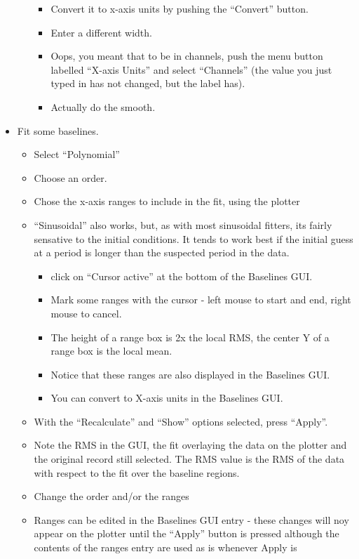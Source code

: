 \begin{itemize}
\begin{itemize}
\begin{itemize}
\item Convert it to x-axis units by pushing the ``Convert'' button.
\item Enter a different width.
\item Oops, you meant that to be in channels, push the menu button
labelled ``X-axis Units'' and select ``Channels'' (the value you just
typed in has not changed, but the label has).
\item Actually do the smooth.
\end{itemize}
\end{itemize}
\item Fit some baselines.
\begin{itemize}
\item Select ``Polynomial'' 
\item Choose an order.
\item Chose the x-axis ranges to include in the fit, using the plotter
\item ``Sinusoidal'' also works, but, as with most sinusoidal fitters, its
fairly sensative to the initial conditions.  It tends to work best if
the initial guess at a period is longer than the suspected period in the data.
\begin{itemize}
\item click on ``Cursor active'' at the bottom of the Baselines GUI.
\item Mark some ranges with the cursor - left mouse to start and end, right
mouse to cancel.
\item The height of a range box is 2x the local RMS, the center Y of a 
range box is the local mean.
\item Notice that these ranges are also displayed in the Baselines GUI.
\item You can convert to X-axis units in the Baselines GUI.
\end{itemize}
\item With the ``Recalculate'' and ``Show'' options selected, press ``Apply''.
\item Note the RMS in the GUI, the fit overlaying the data on the 
plotter and the original record still selected.  The RMS value is the
RMS of the data with respect to the fit over the baseline regions.
\item Change the order and/or the ranges
\item Ranges can be edited in the Baselines GUI entry - these changes will
noy appear on the plotter until the ``Apply'' button is pressed although
the contents of the ranges entry are used as is whenever Apply is

\end{itemize}
\end{itemize}
